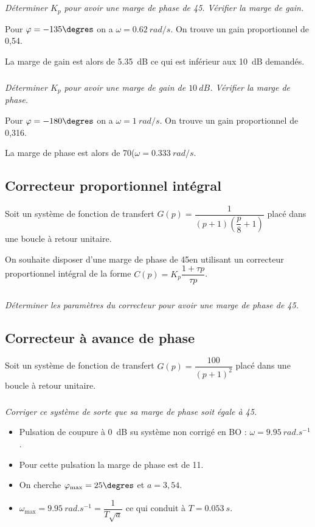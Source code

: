 \documentclass[10pt,fleqn]{article} %
\begin{document}
\begin{multicols}{2}
\subparagraph{}\textit{Déterminer $K_p$ pour avoir une marge de phase de 45\degres. Vérifier la marge de gain. }
\ifprof
\begin{corrige}
Pour $\varphi=-135\degres$ on a $\omega=\SI{0,62}{rad/s}$. On trouve un gain proportionnel de 0,54.

La marge de gain est alors de \SI{5,35}{dB} ce qui est inférieur aux \SI{10}{dB} demandés.
\end{corrige}
\else
\fi

\subparagraph{}\textit{Déterminer $K_p$ pour avoir une marge de gain de $\SI{10}{dB}$. Vérifier la marge de phase. }
\ifprof
\begin{corrige}
Pour $\varphi=-180\degres$ on a $\omega=\SI{1}{rad/s}$. On trouve un gain proportionnel de 0,316.

La marge de phase est alors de 70\degres ($\omega=\SI{0,333}{rad/s}$.
\end{corrige}
\else
\fi



\subsection*{Correcteur proportionnel intégral}
Soit un système de fonction de transfert $G(p)=\dfrac{1}{\left(p+1\right)\left(\dfrac{p}{8}+1\right)}$ placé dans une boucle à retour unitaire.

On souhaite disposer d'une marge de phase de 45\degres en utilisant un correcteur proportionnel intégral de la forme $C(p)=K_p\dfrac{1+\tau p}{\tau p}$.

\subparagraph{}\textit{Déterminer les paramètres du correcteur pour avoir une marge de phase de 45\degres. }

\subsection*{Correcteur à avance de phase}
Soit un système de fonction de transfert $G(p)=\dfrac{100}{\left(p+1\right)^2}$ placé dans une boucle à retour unitaire.
\subparagraph*{}\textit{Corriger ce système de sorte que sa marge de phase soit égale à 45\degres.}

\ifprof
\begin{itemize}
\item Pulsation de coupure à \SI{0}{dB} su système non corrigé en BO : $\omega=\SI{9,95}{rad.s^{-1}}$.
\item Pour cette pulsation la marge de phase est de 11\degres.
\item On cherche $\varphi_{\text{max}}=25\degres$ et $a=3,54$. 
\item $\omega_{\text{max}}=\SI{9,95}{rad.s^{-1}}= \dfrac{1}{T\sqrt{a}}$ ce qui conduit à $T=\SI{0,053}{s}$.
\end{itemize}
\else
\fi



\end{multicols}
\end{document}
